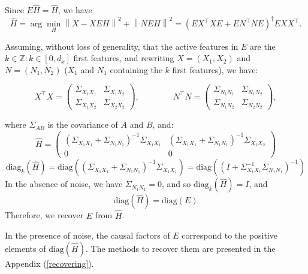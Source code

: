 \documentclass[preprint,12pt,3p]{elsarticle}
\begin{document}
Since  $E\hat H = \hat H$, we have
\begin{equation}
  \hat H = \arg \min_H  \left \| X - XEH\right\| ^2  + \left \| NEH\right \| ^2 = (E X^\top XE +EN^\top NE) ^\dagger EXX^\top.
\end{equation}

Assuming, without loss of generality, that the active features in $E$ are the $k
\in \mathbb{Z}: k \in [0, d_x]$ first features, and rewriting $X=(X_1,X_2)$ and
$N=(N_1,N_2)$ ($X_1$ and $N_1$ containing the $k$ first features), we have:

\begin{equation}
  X^\top X = \left(\begin{array}{lccl}\Sigma_{X_1 X_1} & \Sigma_{X_1 X_2} \\ \Sigma_{X_1 X_2} & \Sigma_{X_2 X_2}\end{array}\right),\qquad\qquad N^\top N = \left(\begin{array}{lccl}\Sigma_{N_1 N_1} & \Sigma_{N_1 N_2} \\ \Sigma_{N_1 N_2} & \Sigma_{N_2 N_2}\end{array}\right),
\end{equation}

where $\Sigma_{A B}$ is the covariance of $A$ and $B$, and:
\begin{equation}
  \hat H = \left(\begin{array}{cc}(\Sigma_{X_1 X_1}+\Sigma_{N_1 N_1})^{-1}\Sigma_{X_1 X_1} & (\Sigma_{X_1 X_1}+\Sigma_{N_1 N_1})^{-1}\Sigma_{X_1 X_2} \\0 & 0\end{array}\right)
\end{equation}
\begin{equation}
  \text{diag}_k (\hat H) = \text{diag}((\Sigma_{X_1 X_1}+\Sigma_{N_1 N_1})^{-1}\Sigma_{X_1 X_1}) = \text{diag}((I+\Sigma_{X_1 X_1}^{-1}\Sigma_{N_1 N_1})^{-1})
  \label{eq:diagk}
\end{equation}
%
%
In the absence of noise, we have $\Sigma_{N_1 N_1}=0$, and so
$\text{diag}_k(\hat H)=I$, and $$\text{diag}(\hat H) = \text{diag}(E)$$
Therefore, we recover $E$ from $\hat H$.


In the presence of noise, the causal factors of $E$ correspond to the positive
elements of $\text{diag}(\hat H)$. The methods to recover them are presented in
the Appendix (\ref{recovering}).
\end{document}
